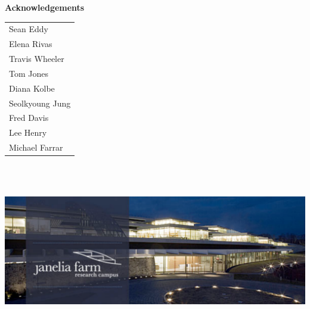 \documentclass[landscape]{slides}
\begin{document}
\begin{slide}

\large
\begin{center}
\large{\textbf{Acknowledgements}} \\

\vspace{0.5in}

\normalsize
\begin{tabular}{l}
Sean Eddy           \\
Elena Rivas         \\
Travis Wheeler      \\
Tom Jones           \\
Diana Kolbe         \\
Seolkyoung Jung     \\
Fred Davis          \\
Lee Henry           \\
Michael Farrar      \\
\end{tabular}

\includegraphics[height=3in]{figs/jfrc-banner1}

\end{center}

\vfill
\end{slide}
\end{document}
